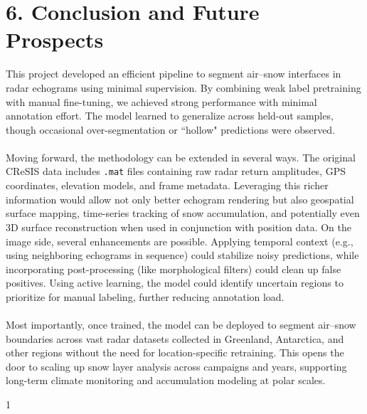 \documentclass[11pt,oneside,openany]{article}
\begin{document}
\section*{6. Conclusion and Future Prospects}
This project developed an efficient pipeline to segment air–snow interfaces in radar echograms using minimal supervision. By combining weak label pretraining with manual fine-tuning, we achieved strong performance with minimal annotation effort. The model learned to generalize across held-out samples, though occasional over-segmentation or ``hollow" predictions were observed.\\\\
Moving forward, the methodology can be extended in several ways. The original CReSIS data includes \texttt{.mat} files containing raw radar return amplitudes, GPS coordinates, elevation models, and frame metadata. Leveraging this richer information would allow not only better echogram rendering but also geospatial surface mapping, time-series tracking of snow accumulation, and potentially even 3D surface reconstruction when used in conjunction with position data. On the image side, several enhancements are possible. Applying temporal context (e.g., using neighboring echograms in sequence) could stabilize noisy predictions, while incorporating post-processing (like morphological filters) could clean up false positives. Using active learning, the model could identify uncertain regions to prioritize for manual labeling, further reducing annotation load.\\\\
Most importantly, once trained, the model can be deployed to segment air–snow boundaries across vast radar datasets collected in Greenland, Antarctica, and other regions without the need for location-specific retraining. This opens the door to scaling up snow layer analysis across campaigns and years, supporting long-term climate monitoring and accumulation modeling at polar scales.



\begin{thebibliography}{1}
\end{thebibliography}
\end{document}
